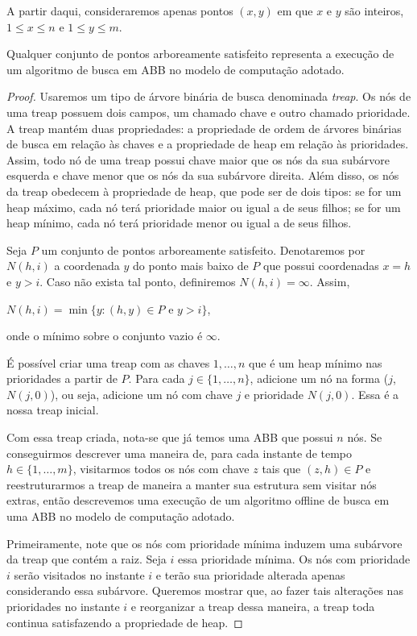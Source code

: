 A partir daqui, consideraremos apenas pontos $(x,y)$ em que $x$ e $y$ são inteiros, $1 \leq x \leq n$ e $1 \leq y \leq m$.

\begin{lemma}Qualquer conjunto de pontos arboreamente satisfeito representa a execução de um algoritmo de busca em ABB no modelo de computação adotado.
\label{lema:ASS_vira_visao_geometrica}
\end{lemma}

\begin{proof}\label{prova:ASS}
Usaremos um tipo de árvore binária de busca denominada \textit{treap}. Os nós de uma treap possuem dois campos, um chamado chave e outro chamado prioridade. A treap mantém duas propriedades: a propriedade de ordem de árvores binárias de busca em relação às chaves e a propriedade de heap em relação às prioridades. Assim, todo nó de uma treap possui chave maior que os nós da sua subárvore esquerda e chave menor que os nós da sua subárvore direita. Além disso, os nós da treap obedecem à propriedade de heap, que pode ser de dois tipos: se for um heap máximo, cada nó terá prioridade maior ou igual a de seus filhos; se for um heap mínimo, cada nó terá prioridade menor ou igual a de seus filhos.

Seja $P$ um conjunto de pontos arboreamente satisfeito. Denotaremos por $N(h,i)$ a coordenada $y$ do ponto mais baixo de $P$ que possui coordenadas $x = h$ e $y > i$. Caso não exista tal ponto, definiremos $N(h,i) = \infty$. Assim, 
\begin{center}
    $N(h,i) = \min\{y : (h,y) \in P \text{ e } y > i\}$,
\end{center}
onde o mínimo sobre o conjunto vazio é $\infty$.

É possível criar uma treap com as chaves $1,\ldots,n$ que é um heap mínimo nas prioridades a partir de $P$. Para cada $j \in \{1,\ldots,n\}$, adicione um nó na forma ($j$, $N(j,0)$), ou seja, adicione um nó com chave $j$ e prioridade $N(j,0)$. Essa é a nossa treap inicial.

Com essa treap criada, nota-se que já temos uma ABB que possui $n$ nós. Se conseguirmos descrever uma maneira de, para cada instante de tempo $h \in \{1,\ldots,m\}$, visitarmos todos os nós com chave $z$ tais que $(z,h) \in P$ e reestruturarmos a treap de maneira a manter sua estrutura sem visitar nós extras, então descrevemos uma execução de um algoritmo offline de busca em uma ABB no modelo de computação adotado.

Primeiramente, note que os nós com prioridade mínima induzem uma subárvore da treap que contém a raiz.
Seja $i$ essa prioridade mínima. Os nós com prioridade $i$ serão visitados no instante $i$ e terão sua prioridade alterada apenas considerando essa subárvore. Queremos mostrar que, ao fazer tais alterações nas prioridades no instante $i$ e reorganizar a treap dessa maneira, a treap toda continua satisfazendo a propriedade de heap.


\end{proof}
